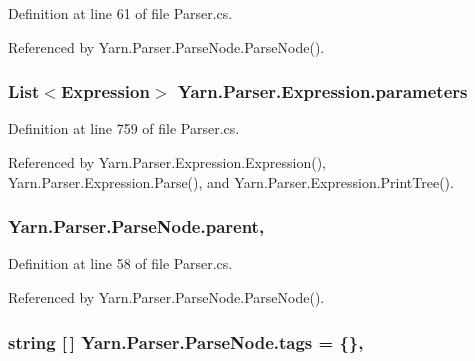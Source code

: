 Definition at line 61 of file Parser.\-cs.



Referenced by Yarn.\-Parser.\-Parse\-Node.\-Parse\-Node().

\hypertarget{a00094_a7b21380bead8ae08b2cfc6594edab32c}{
\subsubsection[{parameters}]{\setlength{\rightskip}{0pt plus 5cm}List$<${\bf Expression}$>$ Yarn.\-Parser.\-Expression.\-parameters\hspace{0.3cm}{\ttfamily [package]}}}\label{a00094_a7b21380bead8ae08b2cfc6594edab32c}


Definition at line 759 of file Parser.\-cs.



Referenced by Yarn.\-Parser.\-Expression.\-Expression(), Yarn.\-Parser.\-Expression.\-Parse(), and Yarn.\-Parser.\-Expression.\-Print\-Tree().

\hypertarget{a00138_af313a82103fcc2ff5a177dbb06b92f7b}{
\subsubsection[{parent}]{ Yarn.\-Parser.\-Parse\-Node.\-parent\hspace{0.3cm}{\ttfamily [package]}, {\ttfamily [inherited]}}}\label{a00138_af313a82103fcc2ff5a177dbb06b92f7b}


Definition at line 58 of file Parser.\-cs.



Referenced by Yarn.\-Parser.\-Parse\-Node.\-Parse\-Node().

\hypertarget{a00138_a58b3a15788fd2d4127d73619dc6d04ae}{
\subsubsection[{tags}]{\setlength{\rightskip}{0pt plus 5cm}string \mbox{[}$\,$\mbox{]} Yarn.\-Parser.\-Parse\-Node.\-tags = \{\}\hspace{0.3cm}{\ttfamily [package]}, {\ttfamily [inherited]}}}\label{a00138_a58b3a15788fd2d4127d73619dc6d04ae}


